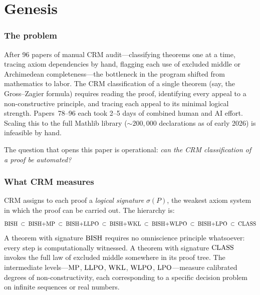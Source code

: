 \documentclass[11pt,a4paper]{article}
\theoremstyle{plain}
\theoremstyle{definition}
\newcommand{\BISH}{\textup{BISH}}
\newcommand{\MP}{\textup{MP}}
\newcommand{\LLPO}{\textup{LLPO}}
\newcommand{\WKL}{\textup{WKL}}
\newcommand{\WLPO}{\textup{WLPO}}
\newcommand{\LPO}{\textup{LPO}}
\newcommand{\CLASS}{\textup{CLASS}}
\begin{document}
\tableofcontents
\newpage


\part{Genesis}\label{part:genesis}

\section{The problem}\label{sec:problem}

After 96 papers of manual CRM audit---classifying theorems one at a time,
tracing axiom dependencies by hand, flagging each use of excluded middle
or Archimedean completeness---the bottleneck in the program shifted from
mathematics to labor.  The CRM classification of a single theorem
(say, the Gross--Zagier formula) requires reading the proof, identifying
every appeal to a non-constructive principle, and tracing each appeal
to its minimal logical strength.  Papers~78--96 each took 2--5 days of
combined human and AI effort.  Scaling this to the full Mathlib library
(${\sim}200{,}000$ declarations as of early 2026) is infeasible by hand.

The question that opens this paper is operational: \emph{can the CRM
classification of a proof be automated?}

\section{What CRM measures}\label{sec:what-crm-measures}

CRM assigns to each proof a \emph{logical signature} $\sigma(P)$, the
weakest axiom system in which the proof can be carried out.  The
hierarchy is:
\[
  \BISH \;\subset\; \BISH{+}\MP \;\subset\; \BISH{+}\LLPO
  \;\subset\; \BISH{+}\WKL \;\subset\; \BISH{+}\WLPO
  \;\subset\; \BISH{+}\LPO \;\subset\; \CLASS
\]
A theorem with signature $\BISH$ requires no omniscience principle
whatsoever: every step is computationally witnessed.  A theorem with
signature $\CLASS$ invokes the full law of excluded middle somewhere
in its proof tree.  The intermediate levels---$\MP$, $\LLPO$, $\WKL$,
$\WLPO$, $\LPO$---measure calibrated degrees of non-constructivity,
each corresponding to a specific decision problem on infinite sequences
or real numbers.
\end{document}

